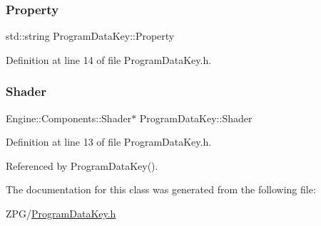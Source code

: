 \subsubsection{\texorpdfstring{Property}{Property}}
{\footnotesize\ttfamily std\+::string Program\+Data\+Key\+::\+Property}



Definition at line 14 of file Program\+Data\+Key.\+h.

\mbox{\label{classProgramDataKey_ac8797a9070abe91cea6ad8615d60fa90}} 
\subsubsection{\texorpdfstring{Shader}{Shader}}
{\footnotesize\ttfamily Engine\+::\+Components\+::\+Shader$\ast$ Program\+Data\+Key\+::\+Shader}



Definition at line 13 of file Program\+Data\+Key.\+h.



Referenced by Program\+Data\+Key().



The documentation for this class was generated from the following file\+:\begin{DoxyCompactItemize}
\item 
Z\+P\+G/\mbox{\hyperlink{ProgramDataKey_8h}{Program\+Data\+Key.\+h}}\end{DoxyCompactItemize}
